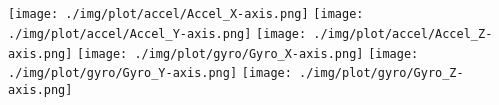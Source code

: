 \renewcommand{\thechapter}{\Alph{chapter}}
\renewcommand{\thefigure}{\Alph{chapter}.\arabic{figure}}
\renewcommand{\chaptername}{Appendix}

\setlength{\beforechapskip}{0pt}
\setlength{\afterchapskip}{0pt}
\setlength{\footskip}{5cm}

\clearpage
\chapter{}\label{apdx:A}
\setlrmarginsandblock{0.5cm}{0.5cm}{*}
\setulmarginsandblock{0.25cm}{0.25cm}{*}
\checkandfixthelayout
\begin{minipage}{\textwidth}
\centering\texttt{[image: ./img/plot/accel/Accel\_X-axis.png]}
\centering\texttt{[image: ./img/plot/accel/Accel\_Y-axis.png]}
\centering\texttt{[image: ./img/plot/accel/Accel\_Z-axis.png]}
\centering\texttt{[image: ./img/plot/gyro/Gyro\_X-axis.png]}
\centering\texttt{[image: ./img/plot/gyro/Gyro\_Y-axis.png]}
\centering\texttt{[image: ./img/plot/gyro/Gyro\_Z-axis.png]}
\end{minipage}
